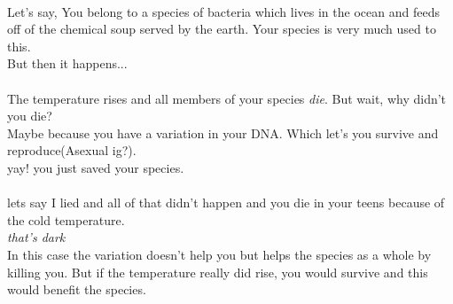 \documentclass[A4]{article}
\begin{document}
    \paragraph{}
    Let's say,
    You belong to a species of bacteria which lives in the ocean and feeds off of the chemical soup served by the earth.
    Your species is very much used to this. \\ 
    But then it happens... \\
     \\
    The temperature rises and all members of your species \emph{die}. But wait, why didn't you die? \\
    Maybe because you have a variation in your DNA. Which let's you survive and reproduce(Asexual ig?). \\
    yay! you just saved your species.\\
     \\
    lets say I lied and all of that didn't happen and you die in your teens because of the cold temperature.\\
    \emph{that's dark}\\
    In this case the variation doesn't help you but helps the species as a whole by killing you.
     But if the temperature really did rise, you would survive and this would benefit the species.
\end{document}
